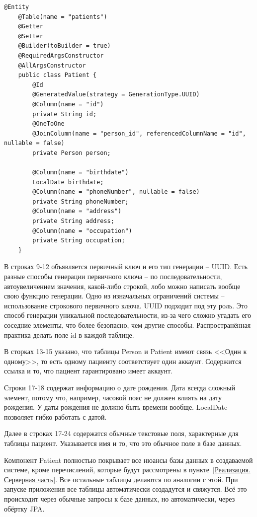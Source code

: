 \documentclass[a4paper,article]{article}
\begin{document}
    \begin{lstlisting}[label=jpapatient,caption=Пример реализации таблицы Patient через JPA]
    @Entity
    @Table(name = "patients")
    @Getter
    @Setter
    @Builder(toBuilder = true)
    @RequiredArgsConstructor
    @AllArgsConstructor
    public class Patient {
        @Id
        @GeneratedValue(strategy = GenerationType.UUID)
        @Column(name = "id")
        private String id;
        @OneToOne
        @JoinColumn(name = "person_id", referencedColumnName = "id", nullable = false)
        private Person person;

        @Column(name = "birthdate")
        LocalDate birthdate;
        @Column(name = "phoneNumber", nullable = false)
        private String phoneNumber;
        @Column(name = "address")
        private String address;
        @Column(name = "occupation")
        private String occupation;
    }
    \end{lstlisting}

    В строках 9-12 объявляется первичный ключ и его тип генерации -- UUID. Есть разные способы генерации первичного ключа -- по последовательности, автоувеличением значения, какой-либо строкой, лобо можно написать вообще свою функцию генерации. Одно из изначальных ограничений системы -- использование строкового первичного ключа. UUID подходит под эту роль. Это способ генерации уникальной последовательности, из-за чего сложно угадать его соседние элементы, что более безопасно, чем другие способы. Распространённая практика делать поле id в каждой таблице.

    В сторках 13-15 указано, что таблицы Person и Patient имеют связь <<Один к одному>>, то есть одному пациенту соответствует один аккаунт. Содержится ссылка и то, что пациент гарантировано имеет аккаунт.

    Строки 17-18 содержат информацию о дате рождения. Дата всегда сложный элемент, потому что, например, часовой пояс не должен влиять на дату рождения. У даты рождения не должно быть времени вообще. LocalDate позволяет гибко работать с датой.

    Далее в строках 17-24 содержатся обычные текстовые поля, характерные для таблицы пациент. Указывается имя и то, что это обычное поле в базе данных.

    Компонент Patient полностью покрывает все нюансы базы данных в создаваемой системе, кроме перечислений, которые будут рассмотрены в пункте~\ref{Реализация. Серверная часть}. Все остальные таблицы делаются по аналогии с этой. При запуске приложения все таблицы автоматически создадутся и свяжутся. Всё это происходит через обычные запросы к базе данных, но автоматически, через обёртку JPA.
\end{document}
